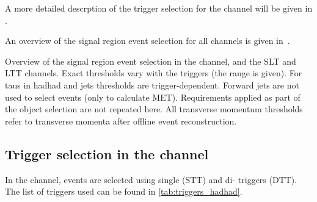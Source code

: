 A more detailed descrption of the trigger selection for the \hadhad
channel will be given in .

An overview of the signal region event selection for all channels is
given in~.

\begin{table}[htbp]
  \centering

  \caption{Overview of the signal region event selection in the
    \hadhad channel, and the \lephad SLT and LTT channels. Exact \pT
    thresholds vary with the triggers (the range is given). For taus
    in hadhad and jets thresholds are trigger-dependent. Forward jets
    are not used to select events (only to calculate
    MET). Requirements applied as part of the object selection are not
    repeated here. All transverse momentum thresholds refer to
    transverse momenta after offline event reconstruction.}%
  \label{tab:event_selection}

  \resizebox{\textwidth}{!}{
    
  }
\end{table}





\subsection{Trigger selection in the \hadhad channel}%
\label{sec:trigger}%
\label{sec:hadhad_trigger_selection}





In the \tauhad\tauhad channel, events are selected using single (STT) and di-\tauhad
triggers (DTT). The list of triggers used can be found in \cref{tab:triggers_hadhad}.

